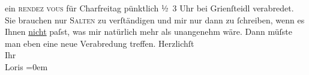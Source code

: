 \begin{ledgroupsized}[t]{13cm}
               ein \textsc{rendez vous} für Charfreitag pünktlich ½ 3 Uhr bei Grienſteidl verabredet. Sie brauchen nur \textsc{Salten} zu verſtändigen und mir nur dann zu ſchreiben, wenn es Ihnen \uline{nicht} paſst, was mir natürlich mehr als unangenehm wäre.
               Dann müſste man eben eine neue Verabredung treffen.\pend
           \pstart
           Herzlichſt{\\[\baselineskip]}Ihr{\\[\baselineskip]}\spacefill\mbox{Loris}\pend
           \leftskip=0em{}
         
         \endnumbering{}\end{ledgroupsized}  \newcommand{\dateiname}{L00093}\newcommand{\titel}{Hugo von Hofmannsthal an Arthur Schnitzler, 10. 4. 1892}\newcommand{\editorInnen}{Martin Anton Müller und Gerd-Hermann Susen}
      